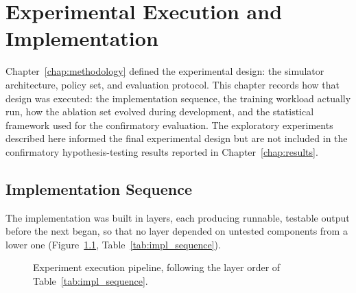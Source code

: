 \chapter{Experimental Execution and Implementation}
\label{chap:experimental-execution}
\setlength{\emergencystretch}{1.5em}

Chapter~\ref{chap:methodology} defined the experimental design: the
simulator architecture, policy set, and evaluation protocol. This
chapter records how that design was executed: the implementation
sequence, the training workload actually run, how the ablation set
evolved during development, and the statistical framework used for the
confirmatory evaluation. The exploratory experiments described here
informed the final experimental design but are not included in the
confirmatory hypothesis-testing results reported in
Chapter~\ref{chap:results}.
\section{Implementation Sequence}
\label{sec:impl_overview}

The implementation was built in layers, each producing runnable,
testable output before the next began, so that no layer depended on
untested components from a lower one (Figure~\ref{fig:exec_pipeline},
Table~\ref{tab:impl_sequence}).

\begin{figure}[htbp]
\centering
{}
\caption{Experiment execution pipeline, following the layer order of
Table~\ref{tab:impl_sequence}.}
\label{fig:exec_pipeline}
\end{figure}


